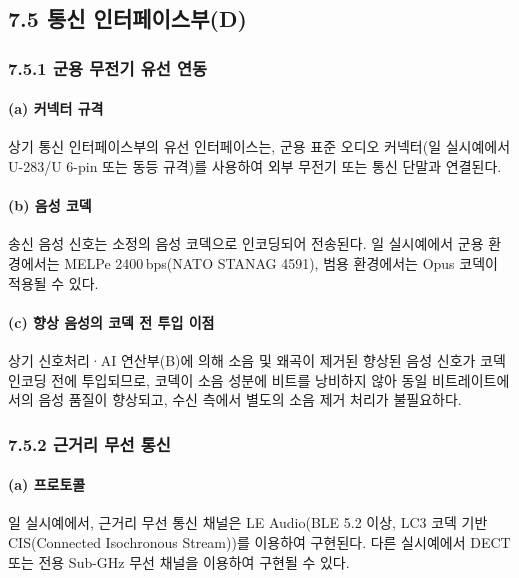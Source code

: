 \documentclass{article}
\begin{document}
\subsection{7.5 통신 인터페이스부(D)}

\subsubsection{7.5.1 군용 무전기 유선 연동}

\paragraph{(a) 커넥터 규격}

상기 통신 인터페이스부의 유선 인터페이스는, 군용 표준 오디오 커넥터(일 실시예에서 U-283/U 6-pin 또는 동등 규격)를 사용하여 외부 무전기 또는 통신 단말과 연결된다.

\paragraph{(b) 음성 코덱}

송신 음성 신호는 소정의 음성 코덱으로 인코딩되어 전송된다. 일 실시예에서 군용 환경에서는 MELPe 2400\,bps(NATO STANAG 4591), 범용 환경에서는 Opus 코덱이 적용될 수 있다.

\paragraph{(c) 향상 음성의 코덱 전 투입 이점}

상기 신호처리·AI 연산부(B)에 의해 소음 및 왜곡이 제거된 향상된 음성 신호가 코덱 인코딩 전에 투입되므로, 코덱이 소음 성분에 비트를 낭비하지 않아 동일 비트레이트에서의 음성 품질이 향상되고, 수신 측에서 별도의 소음 제거 처리가 불필요하다.

\subsubsection{7.5.2 근거리 무선 통신}

\paragraph{(a) 프로토콜}

일 실시예에서, 근거리 무선 통신 채널은 LE Audio(BLE 5.2 이상, LC3 코덱 기반 CIS(Connected Isochronous Stream))를 이용하여 구현된다. 다른 실시예에서 DECT 또는 전용 Sub-GHz 무선 채널을 이용하여 구현될 수 있다.
\end{document}

